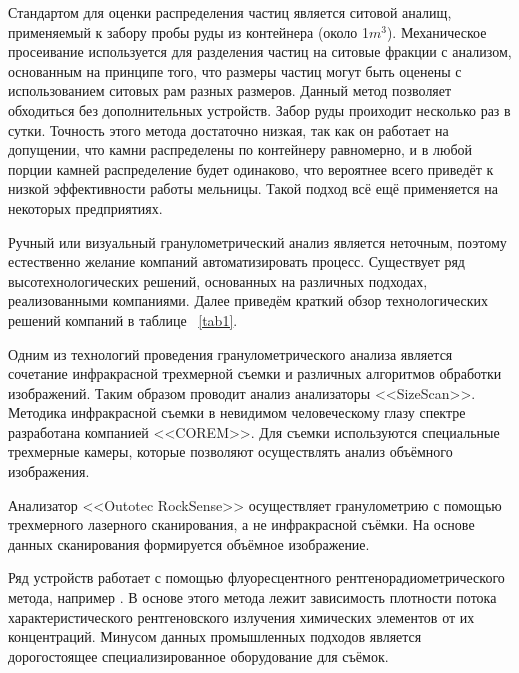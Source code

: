 \documentclass[times]{itmo-student-thesis}
\begin{document}
 Стандартом для оценки распределения частиц является ситовой аналищ,  применяемый к забору пробы руды из контейнера (около 1$m^3$). Механическое просеивание используется для разделения частиц на ситовые фракции с анализом, основанным на принципе того, что размеры частиц могут быть оценены с использованием ситовых рам разных размеров.  Данный метод позволяет обходиться без дополнительных устройств. Забор руды проиходит несколько раз в сутки. Точность этого метода достаточно низкая, так как он работает на допущении, что камни распределены по контейнеру равномерно, и в любой порции камней распределение будет одинаково, что вероятнее всего приведёт к низкой эффективности работы мельницы. Такой подход всё ещё применяется на некоторых предприятиях. 
 
Ручный или визуальный гранулометрический анализ является неточным, поэтому естественно желание компаний автоматизировать процесс. Существует ряд высотехнологических решений, основанных на различных подходах, реализованными компаниями. Далее приведём краткий обзор технологических решений компаний в таблице ~\ref{tab1}.
 
 Одним из технологий проведения гранулометрического анализа является  сочетание инфракрасной трехмерной съемки и различных алгоритмов обработки изображений. Таким образом проводит анализ анализаторы <<SizeScan>>.  Методика инфракрасной съемки в невидимом человеческому глазу спектре разработана компанией <<COREM>>. Для съемки используются специальные  трехмерные камеры,  которые позволяют осуществлять анализ объёмного изображения. 
 
 Анализатор <<Outotec RockSense>> осуществляет гранулометрию с помощью трехмерного лазерного сканирования, а не инфракрасной съёмки. На основе данных сканирования формируется объёмное изображение.
 
Ряд устройств работает  с помощью флуоресцентного рентгенорадиометрического метода, например  .  В основе этого метода лежит зависимость плотности потока характеристического рентгеновского излучения химических элементов от их концентраций.
Минусом данных промышленных подходов является дорогостоящее специализированное оборудование для съёмок. 
\end{document}
